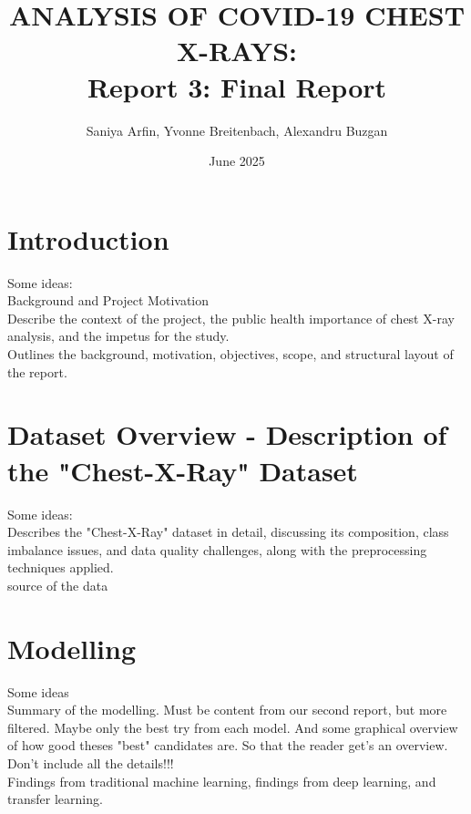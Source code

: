\documentclass{article}
\title{ANALYSIS OF COVID-19 CHEST X-RAYS: \\Report 3: Final Report}
\author{Saniya Arfin, Yvonne Breitenbach, Alexandru Buzgan}
\date{June 2025}
\begin{document}
\maketitle

\tableofcontents

\newpage 

\section{Introduction}
Some ideas: \\
Background and Project Motivation\\
Describe the context of the project, the public health importance of chest X-ray analysis, and the impetus for the study.\\
Outlines the background, motivation, objectives, scope, and structural layout of the report.\\



\section{Dataset Overview - Description of the "Chest-X-Ray" Dataset}
Some ideas: \\
Describes the "Chest-X-Ray" dataset in detail, discussing its composition, class imbalance issues, and data quality challenges, along with the preprocessing techniques applied.\\
source of the data\\


\section{Modelling}
Some ideas\\
Summary of the modelling. Must be content from our second report, but more filtered. Maybe only the best try from each model. And some graphical overview of how good theses "best" candidates are. So that the reader get's an overview. Don't include all the details!!! \\
Findings from traditional machine learning, findings from deep learning, and transfer learning. 
\end{document}
